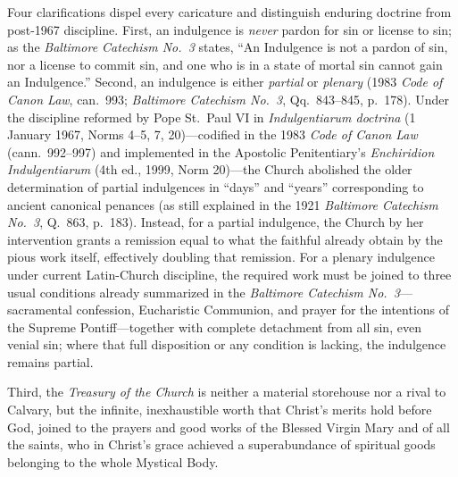 Four clarifications dispel every caricature and distinguish enduring doctrine from post-1967 discipline. First, an indulgence is \textit{never} pardon for sin or license to sin; as the \textit{Baltimore Catechism No.\ 3} states, ``An Indulgence is not a pardon of sin, nor a license to commit sin, and one who is in a state of mortal sin cannot gain an Indulgence.'' Second, an indulgence is either \textit{partial} or \textit{plenary} (1983 \textit{Code of Canon Law}, can.\ 993; \textit{Baltimore Catechism No.\ 3}, Qq.\ 843--845, p.\ 178). Under the discipline reformed by Pope St.\ Paul VI in \textit{Indulgentiarum doctrina} (1 January 1967, Norms 4--5, 7, 20)---codified in the 1983 \textit{Code of Canon Law} (cann.\ 992--997) and implemented in the Apostolic Penitentiary's \textit{Enchiridion Indulgentiarum} (4th ed., 1999, Norm 20)---the Church abolished the older determination of partial indulgences in ``days'' and ``years'' corresponding to ancient canonical penances (as still explained in the 1921 \textit{Baltimore Catechism No.\ 3}, Q.\ 863, p.\ 183). Instead, for a partial indulgence, the Church by her intervention grants a remission equal to what the faithful already obtain by the pious work itself, effectively doubling that remission. For a plenary indulgence under current Latin-Church discipline, the required work must be joined to three usual conditions already summarized in the \textit{Baltimore Catechism No.\ 3}---sacramental confession, Eucharistic Communion, and prayer for the intentions of the Supreme Pontiff---together with complete detachment from all sin, even venial sin; where that full disposition or any condition is lacking, the indulgence remains partial.

Third, the \textit{Treasury of the Church} is neither a material storehouse nor a rival to Calvary, but the infinite, inexhaustible worth that Christ's merits hold before God, joined to the prayers and good works of the Blessed Virgin Mary and of all the saints, who in Christ's grace achieved a superabundance of spiritual goods belonging to the whole Mystical Body.

